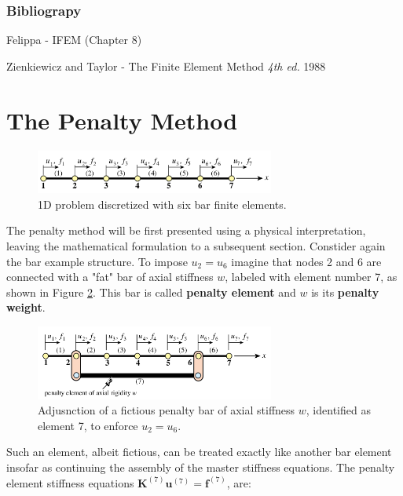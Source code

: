 \documentclass[10pt,b5paper,titlepage]{book}
\newcommand{\m}{\mathbf}
\begin{document}
\subsubsection{Bibliograpy}

Felippa - IFEM (Chapter 8)

Zienkiewicz and Taylor - The Finite Element Method \textit{4th ed.} 1988


\section{The Penalty Method}

\begin{figure}[ht]
    \centering
    \includegraphics[width=0.70\textwidth]{img/1D_mfc_bar.png}
    \caption{1D problem discretized with six bar finite elements.}
    \label{fig:1D-MFC-bar-png-2}
\end{figure}

The penalty method will be first presented using a physical interpretation,
leaving the mathematical formulation to a subsequent section. Constider again
the bar example structure. To impose $ u_2 = u_6 $ imagine that nodes 2 and 6
are connected with a "fat" bar of axial stiffness $ w $, labeled with element
number 7, as shown in Figure \ref{fig:1D-MFC-bar-penalty-png}. This bar is called \textbf{penalty element} and
$ w $ is its \textbf{penalty weight}.

\begin{figure}[ht]
    \centering
    \includegraphics[width=0.70\textwidth]{img/1D_mfc_bar_penalty.png}
    \caption{Adjusnction of a fictious penalty bar of axial stiffness $ w $,
    identified as element 7, to enforce $ u_2 = u_6 $.}
    \label{fig:1D-MFC-bar-penalty-png}
\end{figure}

Such an element, albeit fictious, can be treated exactly like another bar element
insofar as continuing the assembly of the master stiffness equations. The penalty
element stiffness equations $ \m{K}^{(7)} \m{u}^{(7)} = \m{f}^{(7)} $,
are:
\end{document}

